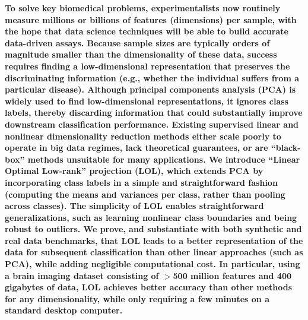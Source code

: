 \documentclass[11pt]{extarticle}
\begin{document}
\textbf{%
To solve key biomedical problems, experimentalists now routinely measure millions or billions of features (dimensions) per sample, with the hope that data science techniques will be able to build  accurate data-driven assays.  Because  sample sizes are typically  orders of magnitude smaller than the dimensionality of these data, success requires finding a low-dimensional representation that preserves the discriminating information (e.g., whether the individual suffers from a particular disease). Although principal components analysis (PCA) is widely used to find low-dimensional representations, it ignores class labels, thereby discarding information that could substantially improve downstream classification performance. 
Existing supervised linear  and nonlinear dimensionality reduction methods either  scale poorly to operate in big data regimes, lack theoretical guarantees, or are  ``black-box'' methods unsuitable for many applications. 
We introduce ``Linear Optimal Low-rank'' projection (LOL), which extends PCA by incorporating class labels in a simple and straightforward fashion (computing the means and variances per class, rather than pooling across classes). The simplicity of LOL enables straightforward generalizations, such as learning nonlinear class boundaries and being robust to outliers.
We prove, and substantiate with both synthetic and real data benchmarks, that LOL leads to a better representation of the data for subsequent classification than other linear approaches (such as PCA), while adding negligible computational cost.  In particular, using a  brain imaging dataset consisting of $>$500 million features and 400 gigabytes of data,  LOL achieves better accuracy  than other methods for any dimensionality, while only requiring a few minutes on a standard  desktop computer.
}
\end{document}
